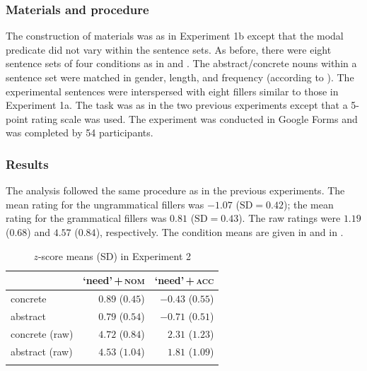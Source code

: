 \documentclass[output=paper]{langscibook}
\begin{document}
\subsubsection{Materials and procedure}

 The construction of materials was as in Experiment 1b except that the modal predicate did not vary within the sentence sets. As before, there were eight sentence sets of four conditions as in  and . The abstract/concrete nouns within a sentence set were matched in gender, length, and frequency (according to \citealt{Ljasevskaja.Sarov2009}). The experimental sentences were interspersed with eight fillers similar to those in Experiment 1a. The task was as in the two previous experiments except that a 5-point rating scale was used. The experiment was conducted in Google Forms and was completed by 54 participants.

\subsubsection{Results}

The analysis followed the same procedure as in the previous experiments. The mean rating for the ungrammatical fillers was $-1.07$ ($\text{SD} =0.42$); the mean rating for the grammatical fillers was $0.81$ ($\text{SD} =0.43$). The raw ratings were $1.19$ ($0.68$) and $4.57$ ($0.84$), respectively. The condition means are given in  and in . %


\begin{table}
\centering
\begin{tabular}{lrr}
\lsptoprule
   & `need'\,+\,\textsc{nom} & `need'\,+\,\textsc{acc}\\
\midrule
concrete  &   $0.89$ ($0.45$) &   $-0.43$ ($0.55$)\\
abstract  &   $0.79$ ($0.54$) &   $-0.71$ ($0.51$)\\
concrete (raw)  &   $4.72$ ($0.84$) &   $2.31$ ($1.23$)\\
abstract (raw) &   $4.53$ ($1.04$) &   $1.81$ ($1.09$)\\
\lspbottomrule
\end{tabular}
\caption{$z$-score means (SD) in Experiment 2}
\label{tab:1:means-exp2}
\end{table}
\end{document}
